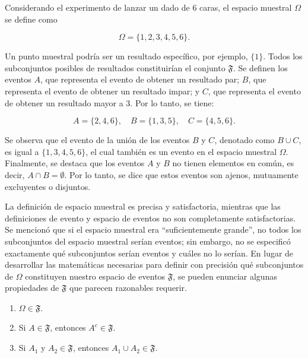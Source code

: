 \documentclass[
  us-letterpaper,
]{scrreprt}
\theoremstyle{plain}
\theoremstyle{definition}
\theoremstyle{definition}
\theoremstyle{plain}
\theoremstyle{remark}
\begin{document}
\begin{tcolorbox}[enhanced jigsaw, breakable, colbacktitle=quarto-callout-caution-color!10!white, rightrule=.15mm, toptitle=1mm, colback=white, left=2mm, colframe=quarto-callout-caution-color-frame, bottomtitle=1mm, opacitybacktitle=0.6, leftrule=.75mm, arc=.35mm, title={Ejemplo (\textbf{\emph{Lanzamiento de un dado}})}, coltitle=black, titlerule=0mm, opacityback=0, bottomrule=.15mm, toprule=.15mm]

Considerando el experimento de lanzar un dado de \(6\) caras, el espacio
muestral \(\Omega\) se define como

\[ \Omega = \{1,2,3,4,5,6\}. \]

Un punto muestral podría ser un resultado específico, por ejemplo,
\(\{1\}\). Todos los subconjuntos posibles de resultados constituirían
el conjunto \(\mathfrak{F}\). Se definen los eventos \(A\), que
representa el evento de obtener un resultado par; \(B\), que representa
el evento de obtener un resultado impar; y \(C\), que representa el
evento de obtener un resultado mayor a 3. Por lo tanto, se tiene:

\[ A= \{2,4,6\},\quad B=\{1,3,5\},\quad C=\{4,5,6\}. \]

Se observa que el evento de la unión de los eventos \(B\) y \(C\),
denotado como \(B\cup C\), es igual a \(\{1, 3, 4, 5, 6\}\), el cual
también es un evento en el espacio muestral \(\Omega\). Finalmente, se
destaca que los eventos \(A\) y \(B\) no tienen elementos en común, es
decir, \(A \cap B = \emptyset\). Por lo tanto, se dice que estos eventos
son ajenos, mutuamente excluyentes o disjuntos.

\end{tcolorbox}

La definición de espacio muestral es precisa y satisfactoria, mientras
que las definiciones de evento y espacio de eventos no son completamente
satisfactorias. Se mencionó que si el espacio muestral era
``suficientemente grande'', no todos los subconjuntos del espacio
muestral serían eventos; sin embargo, no se especificó exactamente qué
subconjuntos serían eventos y cuáles no lo serían. En lugar de
desarrollar las matemáticas necesarias para definir con precisión qué
subconjuntos de \(\Omega\) constituyen nuestro espacio de eventos
\(\mathfrak{F}\), se pueden enunciar algunas propiedades de
\(\mathfrak{F}\) que parecen razonables requerir.

\begin{enumerate}
\def\labelenumi{\roman{enumi}.}
\item
  \(\Omega \in \mathfrak{F}\).
\item
  Si \(A\in\mathfrak{F}\), entonces \(A^c\in \mathfrak{F}\).
\item
  Si \(A_1\) y \(A_2\in \mathfrak{F}\), entonces
  \(A_1\cup A_2\in \mathfrak{F}\).
\end{enumerate}
\end{document}

